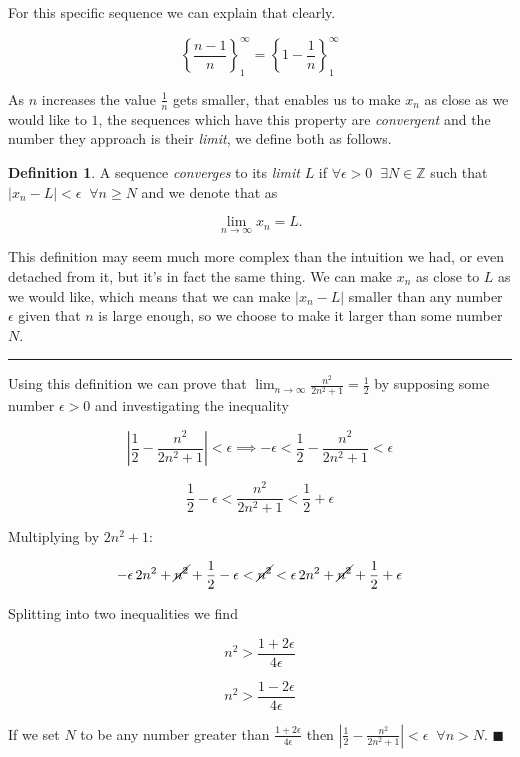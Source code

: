 \documentclass{article}
\theoremstyle{definition}
\newtheorem{definition}{Definition}
\begin{document}
For this specific sequence we can explain that clearly.

\[
\left\{ \frac{n-1}{n} \right\}_1^\infty = \left\{ 1-\frac{1}{n} \right\}_1^\infty
\]

As $n$ increases the value $\frac{1}{n}$ gets smaller, that enables us to make $x_n$ as close as we would like to $1$, the sequences which have this property are \emph{convergent} and the number they approach is their \emph{limit}, we define both as follows.

\begin{definition}
A sequence \emph{converges} to its \emph{limit} $L$ if $\forall \epsilon > 0 \; \; \exists N \in \mathbb{Z}$ such that $|x_n - L| < \epsilon \; \; \forall n \geq N$ and we denote that as

\[
\lim_{n \rightarrow \infty}{x_n} = L.
\]
\end{definition}

This definition may seem much more complex than the intuition we had, or even detached from it, but it's in fact the same thing. We can make $x_n$ as close to $L$ as we would like, which means that we can make $|x_n -L|$ smaller than any number $\epsilon$ given that $n$ is large enough, so we choose to make it larger than some number $N$.

\bigskip\hrule\bigskip

Using this definition we can prove that $\lim_{n \rightarrow \infty} \frac{n^2}{2n^2 + 1} = \frac{1}2$ by supposing some number $\epsilon > 0$ and investigating the inequality

\[
\left| \frac{1}2 - \frac{n^2}{2n^2 + 1} \right| < \epsilon \implies - \epsilon < \frac{1}2 - \frac{n^2}{2n^2 + 1} < \epsilon
\]

\[
\frac{1}2 - \epsilon < \frac{n^2}{2n^2 + 1} < \frac{1}2 + \epsilon
\]

Multiplying by $2n^2 +1$:

\[
- \epsilon \, 2n^2 + \cancel{n^2} + \frac{1}2 - \epsilon < \cancel{n^2} < \epsilon \, 2n^2 + \cancel{n^2} + \frac{1}2 + \epsilon
\]

Splitting into two inequalities we find

\[
n^2 > \frac{1 + 2 \epsilon}{4 \epsilon}
\]

\[
n^2 > \frac{1 - 2 \epsilon}{4 \epsilon}
\]

If we set $N$ to be any number greater than $\frac{1 + 2 \epsilon}{4 \epsilon}$ then $\left| \frac{1}2 - \frac{n^2}{2n^2 + 1} \right| < \epsilon \; \; \forall n>N$. \(\blacksquare\)
\end{document}
